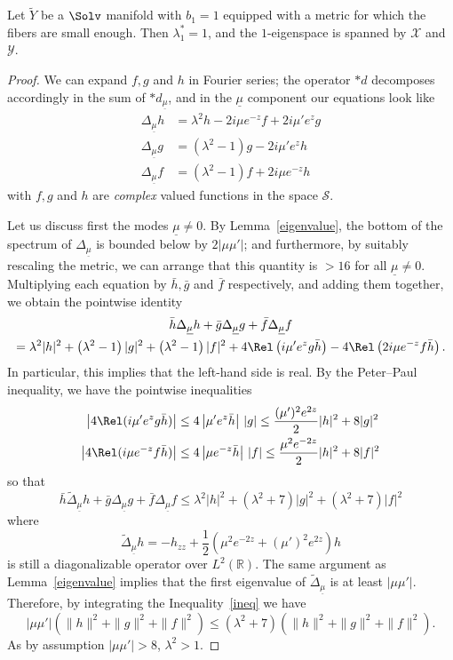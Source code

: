 \begin{lemm}\label{cover}
Let $\tilde{Y}$ be a $\Solv$ manifold with $b_1=1$ equipped with a metric for which the fibers are small enough. Then $\lambda_1^*=1$, and the $1$-eigenspace is spanned by $\mathcal{X}$ and $\mathcal{Y}$.
\end{lemm}


\begin{proof}
We can expand $f,g$ and $h$ in Fourier series; the operator $\ast d$ decomposes accordingly in the sum of $\ast d_{\underline{\mu}}$, and in the $\underline{\mu}$ component our equations look like
\begin{align*}
\Delta_{\underline{\mu}}h&=\lambda^2 h-2i\mu e^{-z} f+2i\mu'e^z g\\
\Delta_{\underline{\mu}}g&=\left(\lambda^2-1\right)g-2i\mu'e^zh\\
\Delta_{\underline{\mu}}f&=\left(\lambda^2-1\right)f+2i\mu e^{-z}h
\end{align*}
with $f,g$ and $h$ are \emph{complex} valued functions in the space $\mathcal{S}$.


Let us discuss first the modes $\underline{\mu}\neq0$. By Lemma~\ref{eigenvalue}, the bottom of the spectrum of $\Delta_{\underline{\mu}}$ is bounded below by $2|\mu\mu'|$; and furthermore, by suitably rescaling the metric, we can arrange that this quantity is $>16$ for all $\underline{\mu}\neq0$. Multiplying each equation by $\bar{h},\bar{g}$ and $\bar{f}$ respectively, and adding them together, we obtain the pointwise identity
\begin{multline*}
\bar{h}\Delta_{\underline{\mu}}h+\bar{g}\Delta_{\underline{\mu}}g+\bar{f}\Delta_{\underline{\mu}}f\\
= \lambda^2|h|^2+\left(\lambda^2-1\right)|g|^2+\left(\lambda^2-1\right)|f|^2+4\Rel\left(i\mu'e^zg\bar{h}\right)-4\Rel\left(2i\mu e^{-z}f\bar{h}\right).
\end{multline*}
In particular, this implies that the left-hand side is real. By the Peter--Paul inequality, we have the pointwise inequalities
\begin{align*}
\left|4\Rel(i\mu'e^zg\bar{h})\right|&\leq4\left|\mu'e^z\bar{h}\right|\,|g|\leq \frac{(\mu')^2e^{2z}}{2}|h|^2+8|g|^2\\
\left|4\Rel(i\mu e^{-z}f\bar{h})\right|&\leq4\left|\mu e^{-z}\bar{h}\right|\,|f|\leq\frac{\mu^2e^{-2z}}{2}|h|^2+8|f|^2
\end{align*}
so that
\begin{equation}\label{ineq}
\bar{h}\tilde{\Delta}_{\underline{\mu}}h+\bar{g}\Delta_{\underline{\mu}}g+\bar{f}\Delta_{\underline{\mu}}f\leq \lambda^2|h|^2+(\lambda^2+7)|g|^2+(\lambda^2+7)|f|^2
\end{equation}
where
\[
\tilde{\Delta}_{\underline{\mu}}h=-h_{zz}+\frac{1}{2}\left(\mu^2 e^{-2z}+(\mu')^2e^{2z}\right)h
\]
is still a diagonalizable operator over $L^2(\mathbb{R})$. The same argument as Lemma~\ref{eigenvalue} implies that the first eigenvalue of $\tilde{\Delta}_{\underline{\mu}}$ is at least $|\mu\mu'|$. Therefore, by integrating the Inequality~\eqref{ineq} we have
\[
|\mu\mu'|\left(\|h\|^2+\|g\|^2+\|f\|^2\right)\leq \left(\lambda^2+7\right)\left(\|h\|^2+\|g\|^2+\|f\|^2\right).
\]
As by assumption $|\mu\mu'|>8$, $\lambda^2>1$.



\end{proof}
